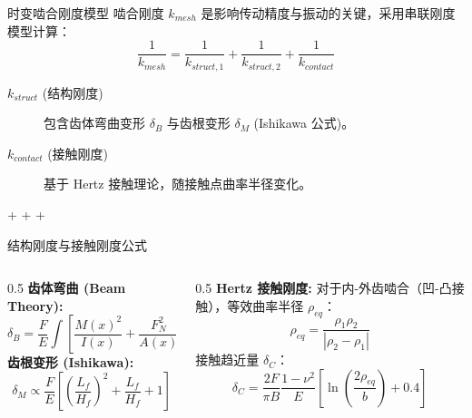 \documentclass[aspectratio=169,10pt,xcolor=table]{ctexbeamer}
\begin{document}
\begin{frame}{时变啮合刚度模型}
  啮合刚度 $k_{mesh}$ 是影响传动精度与振动的关键，采用串联刚度模型计算：
  \begin{equation}
    \frac{1}{k_{mesh}} = \frac{1}{k_{struct,1}} + \frac{1}{k_{struct,2}} + \frac{1}{k_{contact}}
  \end{equation}
  
  \vspace{0.5em}
  \begin{description}
      \item[$k_{struct}$ (结构刚度)] 包含齿体弯曲变形 $\delta_B$ 与齿根变形 $\delta_M$ (Ishikawa 公式)。
      \item[$k_{contact}$ (接触刚度)] 基于 Hertz 接触理论，随接触点曲率半径变化。
  \end{description}

  \centering
   + 
   + 
   + 
\end{frame}

\begin{frame}{结构刚度与接触刚度公式}
  \begin{columns}[T]
    \begin{column}{0.5\textwidth}
      \textbf{齿体弯曲 (Beam Theory):}
      \scriptsize
      \begin{equation}
      \delta_B = \frac{F}{E} \int \left[ \frac{M(x)^2}{I(x)} + \frac{F_N^2}{A(x)} + k \frac{F_S^2}{A(x)} \right] dx
      \end{equation}
      \normalsize
      \textbf{齿根变形 (Ishikawa):}
      \scriptsize
      \begin{equation}
      \delta_M \propto \frac{F}{E} \left[ \left(\frac{L_f}{H_f}\right)^2 + \frac{L_f}{H_f} + 1 \right]
      \end{equation}
    \end{column}
    \begin{column}{0.5\textwidth}
      \textbf{Hertz 接触刚度:}
      对于内-外齿啮合（凹-凸接触），等效曲率半径 $\rho_{eq}$：
      \begin{equation}
      \rho_{eq} = \frac{\rho_1 \rho_2}{|\rho_2 - \rho_1|}
      \end{equation}
      接触趋近量 $\delta_C$：
      \begin{equation}
      \delta_C = \frac{2F}{\pi B} \frac{1-\nu^2}{E} \left[ \ln\left(\frac{2\rho_{eq}}{b}\right) + 0.4 \right]
      \end{equation}
    \end{column}
  \end{columns}
\end{frame}
\end{document}
